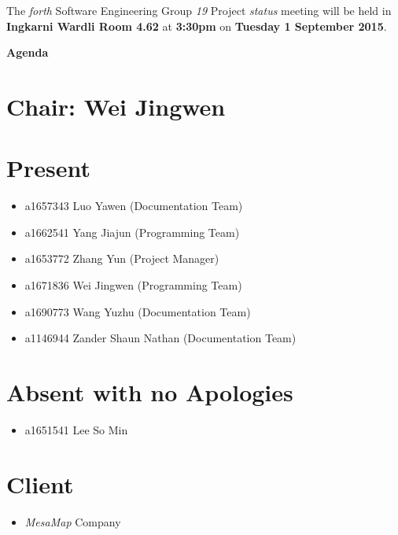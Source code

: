 \documentclass[a4paper] {article}
\begin{document}
	
	\vspace*{-50pt}
	
	\noindent The \emph{forth} Software Engineering Group \emph{19} Project \emph{status} meeting will
	be held in \textbf{Ingkarni Wardli Room 4.62} at \textbf {3:30pm} on \textbf{Tuesday 1 September 2015}.
	
	
	\begin{center}
		\huge \textbf {Agenda}
	\end{center}
	

	\section*{Chair: Wei Jingwen}
	
	\vspace*{10pt}
	
	\section{Present}
	\begin{itemize}
		\item a1657343 Luo Yawen (Documentation Team)
		\item a1662541 Yang Jiajun (Programming Team)
		\item a1653772 Zhang Yun (Project Manager)
		\item a1671836 Wei Jingwen (Programming Team)
		\item a1690773 Wang Yuzhu (Documentation Team)
		\item a1146944 Zander Shaun Nathan (Documentation Team)
	\end{itemize}
	
	\section{Absent with no Apologies}
	\begin{itemize}
		\item a1651541 Lee So Min
	\end{itemize}  
	
        \section{Client}
        \begin{itemize}
            \item \emph{MesaMap} Company
        \end{itemize} 
	
\end{document}
